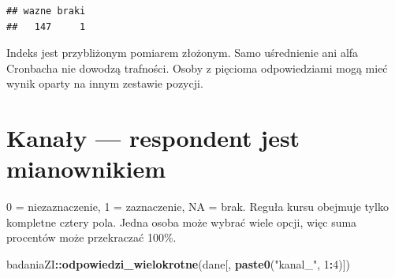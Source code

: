 \documentclass[
  polish,
  11pt,
  a4paper,
]{article}
\newenvironment{Shaded}{\begin{snugshade}}{\end{snugshade}}
\newcommand{\AttributeTok}[1]{\textcolor[rgb]{0.13,0.29,0.53}{#1}}
\newcommand{\DecValTok}[1]{\textcolor[rgb]{0.00,0.00,0.81}{#1}}
\newcommand{\FunctionTok}[1]{\textcolor[rgb]{0.13,0.29,0.53}{\textbf{#1}}}
\newcommand{\NormalTok}[1]{#1}
\newcommand{\OtherTok}[1]{\textcolor[rgb]{0.56,0.35,0.01}{#1}}
\newcommand{\SpecialCharTok}[1]{\textcolor[rgb]{0.81,0.36,0.00}{\textbf{#1}}}
\newcommand{\StringTok}[1]{\textcolor[rgb]{0.31,0.60,0.02}{#1}}
\begin{document}
\begin{Shaded}
\end{Shaded}

\begin{verbatim}
## wazne braki
##   147     1
\end{verbatim}

Indeks jest przybliżonym pomiarem złożonym. Samo uśrednienie ani alfa
Cronbacha nie dowodzą trafności. Osoby z pięcioma odpowiedziami mogą
mieć wynik oparty na innym zestawie pozycji.

\section{Kanały --- respondent jest
mianownikiem}\label{kanaux142y-respondent-jest-mianownikiem}

0 = niezaznaczenie, 1 = zaznaczenie, NA = brak. Reguła kursu obejmuje
tylko kompletne cztery pola. Jedna osoba może wybrać wiele opcji, więc
suma procentów może przekraczać 100\%.

\begin{Shaded}
\begin{Highlighting}[]
\NormalTok{badaniaZI}\SpecialCharTok{::}\FunctionTok{odpowiedzi\_wielokrotne}\NormalTok{(dane[, }\FunctionTok{paste0}\NormalTok{(}\StringTok{"kanal\_"}\NormalTok{, }\DecValTok{1}\SpecialCharTok{:}\DecValTok{4}\NormalTok{)])}
\end{Highlighting}
\end{Shaded}
\end{document}
